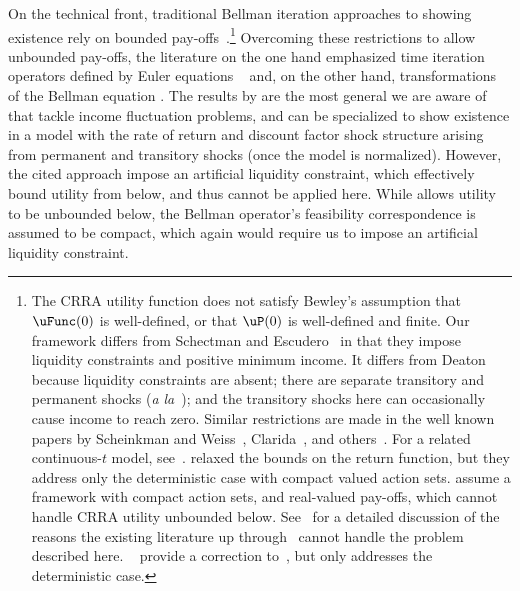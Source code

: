 \documentclass[BufferStockTheory]{subfiles}
\begin{document}
On the technical front, traditional Bellman iteration approaches to showing existence rely on bounded pay-offs~\citep{slpMethods}.\footnote{The CRRA utility function does not satisfy Bewley's assumption that $\uFunc(0)$ is well-defined, or that $\uP(0)$ is well-defined and finite.
Our framework differs from Schectman and Escudero~\citeyearpar{seIncFluct} in that they impose liquidity constraints and positive minimum income.
It differs from Deaton~\citeyearpar{deatonLiqConstr} because liquidity constraints are absent; there are separate transitory and permanent shocks (\textit{a la}~\cite{muthOptimal}); and the transitory shocks here can occasionally cause income to reach zero.
Similar restrictions are made in the well known papers by Scheinkman and Weiss~\citeyearpar{scheinkman&weiss:borrowing}, Clarida~\citep{claridaErgodic}, and others~\cite{cwcUnderUncert}.
For a related continuous-$t$ model, see~\cite{tocheUrisk}.
\cite{asHomogeneous} relaxed the bounds on the return function, but they address only the deterministic case with compact valued action sets.
\cite{mnUnique} assume a framework with compact action sets, and real-valued pay-offs, which cannot handle CRRA utility unbounded below.
See~\cite{yaoNote} for a detailed discussion of the reasons the existing literature up through~\cite{mnUnique} cannot handle the problem described here.
\@~\cite{mvExistence} provide a correction to~\cite{rrExistence}, but only addresses the deterministic case.} Overcoming these restrictions to allow unbounded pay-offs, the literature on the one hand emphasized time iteration operators defined by Euler equations ~\citep{deatonLiqConstr, lsIncFluct, mstIncFluct} and, on the other hand, transformations of the Bellman equation  \citep{maUnboundedDP, rinconZapatero2024}.
The results by \cite{mstIncFluct,maUnboundedDP} are the most general we are aware of that tackle income fluctuation problems, and can be specialized to show existence in a model with the rate of return and discount factor shock structure arising from permanent and transitory shocks (once the model is normalized).
However, the cited approach impose an artificial liquidity constraint, which effectively bound utility from below, and thus cannot be applied here.
While \cite{rinconZapatero2024} allows utility to be unbounded below, the Bellman operator's feasibility correspondence is assumed to be compact, which again would require us to impose an artificial liquidity constraint.
\end{document}
